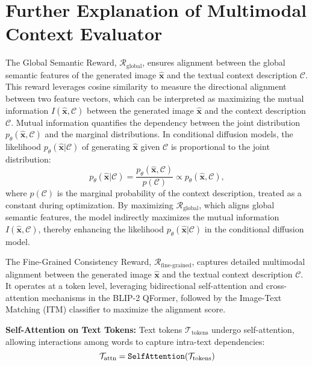 \section{Further Explanation of Multimodal Context Evaluator}
The Global Semantic Reward, \(\mathcal{R}_\textrm{global}\), ensures alignment between the global semantic features of the generated image \(\mathbf{\hat{x}}\) and the textual context description \(\mathcal{C}\). This reward leverages cosine similarity to measure the directional alignment between two feature vectors, which can be interpreted as maximizing the mutual information \(I(\mathbf{\hat{x}}, \mathcal{C})\) between the generated image \(\mathbf{\hat{x}}\) and the context description \(\mathcal{C}\). Mutual information quantifies the dependency between the joint distribution \(p_{\theta}(\mathbf{\hat{x}}, \mathcal{C})\) and the marginal distributions. In conditional diffusion models, the likelihood \(p_{\theta}(\mathbf{\hat{x}} \vert \mathcal{C})\) of generating \(\mathbf{\hat{x}}\) given \(\mathcal{C}\) is proportional to the joint distribution:
\[
p_{\theta}(\mathbf{\hat{x}} \vert \mathcal{C}) = \frac{p_{\theta}(\mathbf{\hat{x}}, \mathcal{C})}{p(\mathcal{C})} \propto p_{\theta}(\mathbf{\hat{x}}, \mathcal{C}),
\]
where \(p(\mathcal{C})\) is the marginal probability of the context description, treated as a constant during optimization. By maximizing \(\mathcal{R}_\textrm{global}\), which aligns global semantic features, the model indirectly maximizes the mutual information \(I(\mathbf{\hat{x}}, \mathcal{C})\), thereby enhancing the likelihood \(p_{\theta}(\mathbf{\hat{x}} \vert \mathcal{C})\) in the conditional diffusion model.


The Fine-Grained Consistency Reward, $\mathcal{R}_{\textrm{fine-grained}}$, captures detailed multimodal alignment between the generated image $\mathbf{\hat{x}}$ and the textual context description $\mathcal{C}$. It operates at a token level, leveraging bidirectional self-attention and cross-attention mechanisms in the BLIP-2 QFormer, followed by the Image-Text Matching (ITM) classifier to maximize the alignment score.

\textbf{Self-Attention on Text Tokens:}
    Text tokens $\mathcal{T}_{\mathrm{tokens}}$ undergo self-attention, allowing interactions among words to capture intra-text dependencies:
    \begin{equation}
        \mathcal{T}_{\mathrm{attn}} = \tt{SelfAttention}(\mathcal{T}_{\mathrm{tokens}})
    \end{equation}

